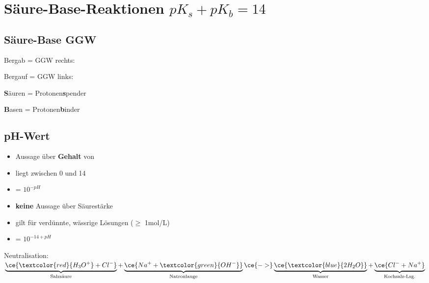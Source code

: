 \section{Säure-Base-Reaktionen $pK_{s}+ pK_{b} = 14$}
    
\subsection{Säure-Base GGW}
    \begin{minipage}{0.65\columnwidth}
        Bergab = GGW rechts: 

        Bergauf = GGW links: 
    \end{minipage}
    \hfill
    \begin{minipage}{0.33\columnwidth}
        \textbf{S}äuren = Protonen\textbf{s}pender

        \textbf{B}asen = Protonen\textbf{b}inder
    \end{minipage}

\subsection{pH-Wert}
    \begin{minipage}{0.4\columnwidth}
        \begin{itemize}
            \item Aussage über \textbf{Gehalt} von 
            \item liegt zwischen 0 und 14
            \item \ce{[H3O+]} = $10^{-pH}$
        \end{itemize}
    \end{minipage}
    \hfill
    \begin{minipage}{0.59\columnwidth}
        \begin{itemize}
            \item \textbf{keine} Aussage über Säurestärke
            \item gilt für verdünnte, wässrige Lösungen ($\geq$ 1mol/L)
            \item \ce{[OH^-]} = $10^{-14+pH}$
        \end{itemize}
    \end{minipage}
    
    Neutralisation: $\underbrace{\ce{\textcolor{red}{H_3O^+} + {Cl^-}}}_{\text{Salzsäure}} + \underbrace{\ce{{Na^+} + \textcolor{green}{OH^-}}}_{\text{Natronlauge}} \ce{->} \underbrace{\ce{\textcolor{blue}{2 H_2O}}}_{\text{Wasser}} + \underbrace{\ce{{Cl^-} + {Na^+}}}_{\text{Kochsalz-Lsg.}}$